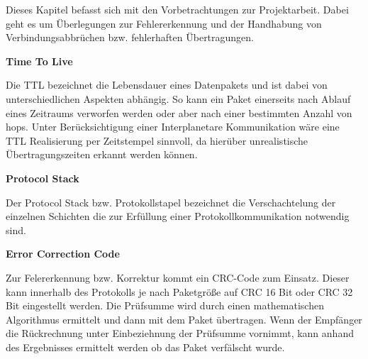 

Dieses Kapitel befasst sich mit den Vorbetrachtungen zur Projektarbeit. Dabei
geht es um {\"U}berlegungen zur Fehlererkennung und der Handhabung von
Verbindungsabbr{\"u}chen bzw. fehlerhaften {\"U}bertragungen.

\textbf{Time To Live}

Die TTL bezeichnet die Lebensdauer eines Datenpakets und ist dabei von
unterschiedlichen Aspekten abh{\"a}ngig. So kann ein Paket einerseits nach
Ablauf eines Zeitraums verworfen werden oder aber nach einer bestimmten Anzahl
von hops. Unter Ber{\"u}cksichtigung einer Interplanetare Kommunikation w{\"a}re
eine TTL Realisierung per Zeitstempel sinnvoll, da hier{\"u}ber unrealistische
{\"U}bertragungszeiten erkannt werden k{\"o}nnen.

\textbf{Protocol Stack}

Der Protocol Stack bzw. Protokollstapel bezeichnet die Verschachtelung der
einzelnen Schichten die zur Erf{\"u}llung einer Protokollkommunikation notwendig
sind.

\textbf{Error Correction Code}

Zur Felererkennung bzw. Korrektur kommt ein CRC-Code zum Einsatz. Dieser kann
innerhalb des Protokolls je nach Paketgr{\"o}{\ss}e auf CRC 16 Bit oder CRC 32
Bit eingestellt werden. Die Pr{\"u}fsumme wird durch einen mathematischen
Algorithmus ermittelt und dann mit dem Paket {\"u}bertragen. Wenn der
Empf{\"a}nger die R{\"u}ckrechnung unter Einbeziehnung der Pr{\"u}fsumme
vornimmt, kann anhand des Ergebnisses ermittelt werden ob das Paket
verf{\"a}lscht wurde.
